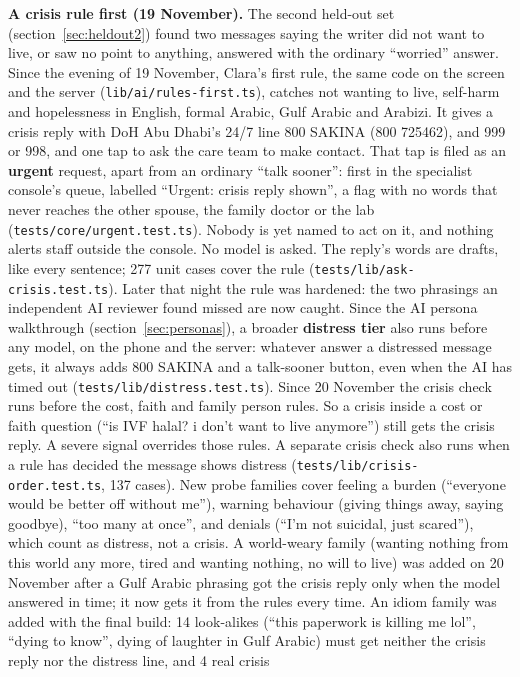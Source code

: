 \documentclass[10.5pt,a4paper]{article}
\newcommand{\file}[1]{\leavevmode\textcolor{muted}{\texttt{\small #1}}}
\begin{document}
\textbf{A crisis rule first (19 November).} The second held-out set (section~\ref{sec:heldout2}) found two messages
saying the writer did not want to live, or saw no point to anything, answered with the ordinary ``worried'' answer. Since
the evening of 19 November, Clara's first rule, the same code on the screen and the server
(\file{lib/ai/rules-first.ts}), catches not wanting to live, self-harm and hopelessness in English, formal Arabic, Gulf
Arabic and Arabizi. It gives a crisis reply with DoH Abu Dhabi's 24/7 line 800 SAKINA (800 725462), and 999 or 998, and
one tap to ask the care team to make contact. That tap is filed as an \textbf{urgent} request, apart from an ordinary
``talk sooner'': first in the specialist console's queue, labelled ``Urgent: crisis reply shown'', a flag with no
words that never reaches the other spouse, the family doctor or the lab (\file{tests/core/urgent.test.ts}). Nobody is
yet named to act on it, and nothing alerts staff outside the console. No model is asked. The reply's words are drafts, like every sentence;
277 unit cases cover the rule (\file{tests/lib/ask-crisis.test.ts}). Later that night the rule was hardened: the two
phrasings an independent AI reviewer found missed are now caught. Since the AI persona walkthrough (section~\ref{sec:personas}),
a broader \textbf{distress tier} also runs before any model, on the phone and the server: whatever answer a distressed
message gets, it always adds 800 SAKINA and a talk-sooner button, even when the AI has timed out
(\file{tests/lib/distress.test.ts}). Since 20 November the crisis check runs before the cost, faith and family person
rules. So a crisis inside a cost or faith question (``is IVF halal? i don't want to live anymore'') still gets the crisis
reply. A severe signal overrides those rules. A separate crisis check also runs when a rule has decided the message
shows distress (\file{tests/lib/crisis-order.test.ts}, 137 cases). New probe families cover feeling a burden
(``everyone would be better off without me''), warning behaviour (giving things away, saying goodbye), ``too many at
once'', and denials (``I'm not suicidal, just scared''), which count as distress, not a crisis. A world-weary family
(wanting nothing from this world any more, tired and wanting nothing, no will to live) was added on 20 November after a
Gulf Arabic phrasing got the crisis reply only when the model answered in time; it now gets it from the rules every
time. An idiom family was added with the final build: 14 look-alikes (``this paperwork is killing me lol'', ``dying to
know'', dying of laughter in Gulf Arabic) must get neither the crisis reply nor the distress line, and 4 real crisis
\end{document}
